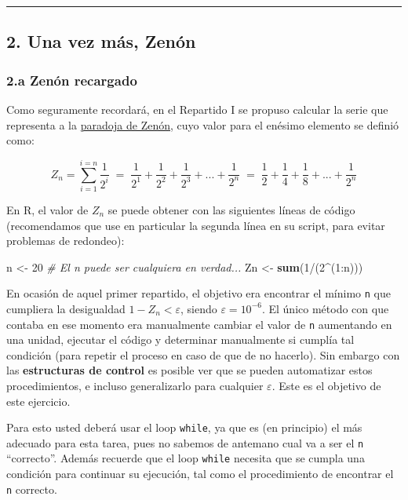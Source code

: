\documentclass[]{article}
\newenvironment{Shaded}{}{}
\newcommand{\KeywordTok}[1]{\textcolor[rgb]{0.00,0.44,0.13}{\textbf{{#1}}}}
\newcommand{\DecValTok}[1]{\textcolor[rgb]{0.25,0.63,0.44}{{#1}}}
\newcommand{\CommentTok}[1]{\textcolor[rgb]{0.38,0.63,0.69}{\textit{{#1}}}}
\newcommand{\NormalTok}[1]{{#1}}
\begin{document}
\begin{center}\rule{3in}{0.4pt}\end{center}

\subsection{2. Una vez más, Zenón}

\subsubsection{2.a Zenón recargado}

Como seguramente recordará, en el Repartido I se propuso calcular la
serie que representa a la
\href{https://es.wikipedia.org/wiki/Paradojas\_de\_Zen\%C3\%B3n\#La\_dicotom.C3.ADa}{paradoja
de Zenón}, cuyo valor para el enésimo elemento se definió como:

\[
  Z_n = \sum_{i=1}^{i=n} \frac{1}{2 ^ i} \;=\;
  \frac{1}{2 ^ 1} + \frac{1}{2 ^ 2} + \frac{1}{2 ^ 3} + ... + \frac{1}{2 ^ n} \;=\;
  \frac{1}{2} + \frac{1}{4} + \frac{1}{8} + ... + \frac{1}{2 ^ n}
\]

En R, el valor de $Z_n$ se puede obtener con las siguientes líneas de
código (recomendamos que use en particular la segunda línea en su
script, para evitar problemas de redondeo):

\begin{Shaded}
\begin{Highlighting}[]
\NormalTok{n <- }\DecValTok{20}  \CommentTok{# El n puede ser cualquiera en verdad...}
\NormalTok{Zn <- }\KeywordTok{sum}\NormalTok{(}\DecValTok{1}\NormalTok{/(}\DecValTok{2}\NormalTok{^(}\DecValTok{1}\NormalTok{:n)))}
\end{Highlighting}
\end{Shaded}
En ocasión de aquel primer repartido, el objetivo era encontrar el
mínimo \texttt{n} que cumpliera la desigualdad $1 - Z_n < \varepsilon$,
siendo $\varepsilon = 10 ^ {-6}$. El único método con que contaba en ese
momento era manualmente cambiar el valor de \texttt{n} aumentando en una
unidad, ejecutar el código y determinar manualmente si cumplía tal
condición (para repetir el proceso en caso de que de no hacerlo). Sin
embargo con las \textbf{estructuras de control} es posible ver que se
pueden automatizar estos procedimientos, e incluso generalizarlo para
cualquier $\varepsilon$. Este es el objetivo de este ejercicio.

Para esto usted deberá usar el loop \texttt{while}, ya que es (en
principio) el más adecuado para esta tarea, pues no sabemos de antemano
cual va a ser el \texttt{n} ``correcto''. Además recuerde que el loop
\texttt{while} necesita que se cumpla una condición para continuar su
ejecución, tal como el procedimiento de encontrar el \texttt{n}
correcto.
\end{document}
